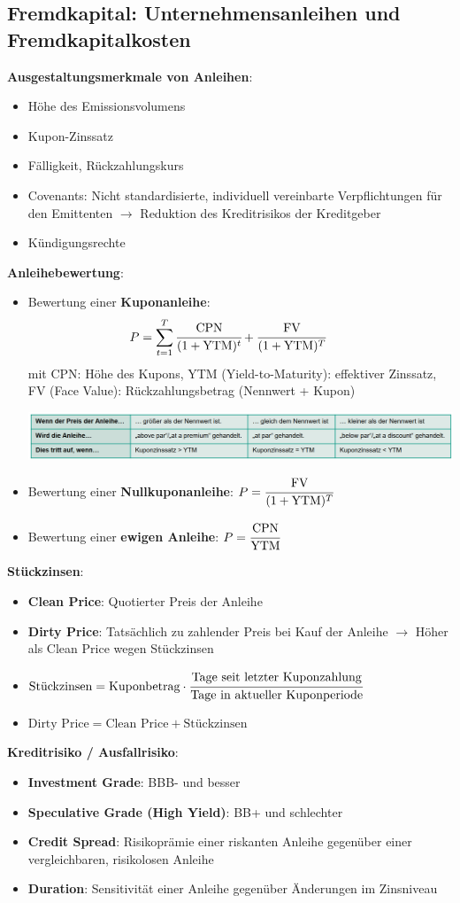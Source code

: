 \subsection{Fremdkapital: Unternehmensanleihen und Fremdkapitalkosten}
\textbf{Ausgestaltungsmerkmale von Anleihen}:
\begin{itemize}
	\item Höhe des Emissionsvolumens
	\item Kupon-Zinssatz
	\item Fälligkeit, Rückzahlungskurs
	\item Covenants: Nicht standardisierte, individuell vereinbarte Verpflichtungen für den Emittenten $\rightarrow$ Reduktion des Kreditrisikos der Kreditgeber
	\item Kündigungsrechte
\end{itemize}
\bigskip
\textbf{Anleihebewertung}:
\begin{itemize}
	\item Bewertung einer \textbf{Kuponanleihe}: $$P=\sum\limits_{t=1}^T \cfrac{\text{CPN}}{(1+\text{YTM})^t}+\cfrac{\text{FV}}{(1+\text{YTM})^T}\qquad$$
	mit CPN: Höhe des Kupons, YTM (Yield-to-Maturity): effektiver Zinssatz, FV (Face Value): Rückzahlungsbetrag (Nennwert + Kupon)
	\begin{center}
		\includegraphics[width=\textwidth]{images/e5.png}
	\end{center}
	\item Bewertung einer \textbf{Nullkuponanleihe}: $P=\cfrac{\text{FV}}{(1+\text{YTM})^T}$
	\item Bewertung einer \textbf{ewigen Anleihe}: $P=\cfrac{\text{CPN}}{\text{YTM}}$
\end{itemize}

\textbf{Stückzinsen}: 
\begin{itemize}
	\item \textbf{Clean Price}: Quotierter Preis der Anleihe
	\item \textbf{Dirty Price}: Tatsächlich zu zahlender Preis bei Kauf der Anleihe $\rightarrow$ Höher als Clean Price wegen Stückzinsen
	\item $\text{Stückzinsen}=\text{Kuponbetrag}\cdot\cfrac{\text{Tage seit letzter Kuponzahlung}}{\text{Tage in aktueller Kuponperiode}}$
	\item $\text{Dirty Price}=\text{Clean Price}+\text{Stückzinsen}$
\end{itemize}

\textbf{Kreditrisiko / Ausfallrisiko}:
\begin{itemize}
	\item \textbf{Investment Grade}: BBB- und besser
	\item \textbf{Speculative Grade (High Yield)}: BB+ und schlechter
	\item \textbf{Credit Spread}: Risikoprämie einer riskanten Anleihe gegenüber einer vergleichbaren, risikolosen Anleihe
	\item \textbf{Duration}: Sensitivität einer Anleihe gegenüber Änderungen im Zinsniveau
\end{itemize}


